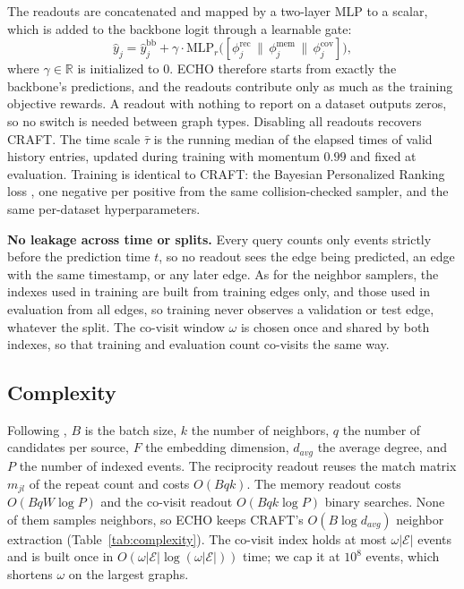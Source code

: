 \documentclass[twoside]{article}
\newcommand{\ours}{ECHO}
\newcommand{\R}{\mathbb{R}}
\begin{document}
The readouts are concatenated and mapped by a two-layer MLP to a scalar, which is added to the backbone logit through a learnable gate:
\begin{equation}
\hat{y}_j=\hat{y}^{\mathrm{bb}}_j+\gamma\cdot\mathrm{MLP}_r\big([\phi^{\mathrm{rec}}_j\,\|\,\phi^{\mathrm{mem}}_j\,\|\,\phi^{\mathrm{cov}}_j]\big),
\label{eq:fusion}
\end{equation}
where $\gamma\in\R$ is initialized to $0$. \ours{} therefore starts from exactly the backbone's predictions, and the readouts contribute only as much as the training objective rewards. A readout with nothing to report on a dataset outputs zeros, so no switch is needed between graph types. Disabling all readouts recovers CRAFT. The time scale $\bar{\tau}$ is the running median of the elapsed times of valid history entries, updated during training with momentum $0.99$ and fixed at evaluation. Training is identical to CRAFT: the Bayesian Personalized Ranking loss \citep{rendle2012bpr}, one negative per positive from the same collision-checked sampler, and the same per-dataset hyperparameters.

\textbf{No leakage across time or splits.} Every query counts only events strictly before the prediction time $t$, so no readout sees the edge being predicted, an edge with the same timestamp, or any later edge. As for the neighbor samplers, the indexes used in training are built from training edges only, and those used in evaluation from all edges, so training never observes a validation or test edge, whatever the split. The co-visit window $\omega$ is chosen once and shared by both indexes, so that training and evaluation count co-visits the same way.

\subsection{Complexity}

Following \citet{yi2025craft}, $B$ is the batch size, $k$ the number of neighbors, $q$ the number of candidates per source, $F$ the embedding dimension, $d_{avg}$ the average degree, and $P$ the number of indexed events. The reciprocity readout reuses the match matrix $m_{jl}$ of the repeat count and costs $O(Bqk)$. The memory readout costs $O(BqW\log P)$ and the co-visit readout $O(Bqk\log P)$ binary searches. None of them samples neighbors, so \ours{} keeps CRAFT's $O(B\log d_{avg})$ neighbor extraction (Table~\ref{tab:complexity}). The co-visit index holds at most $\omega|\mathcal{E}|$ events and is built once in $O(\omega|\mathcal{E}|\log(\omega|\mathcal{E}|))$ time; we cap it at $10^8$ events, which shortens $\omega$ on the largest graphs.
\end{document}
